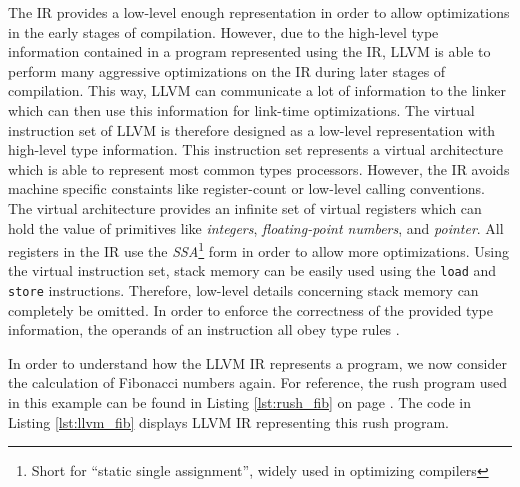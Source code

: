 The IR provides a low-level enough representation in order to allow optimizations in the early stages of compilation.
However, due to the high-level type information contained in a program represented using the IR,
LLVM is able to perform many aggressive optimizations on the IR during later stages of compilation.
This way, LLVM can communicate a lot of information to the linker which can then use this information for link-time optimizations.
The virtual instruction set of LLVM is therefore designed as a low-level representation with high-level type information.
This instruction set represents a virtual architecture which is able to represent most common types processors.
However, the IR avoids machine specific constaints like register-count or low-level calling conventions.
The virtual architecture provides an infinite set of virtual registers which can hold the value of primitives like \emph{integers}, \emph{floating-point numbers}, and \emph{pointer}.
All registers in the IR use the \emph{SSA}\footnote{Short for \enquote{static single assignment}, widely used in optimizing compilers} form in order to allow more optimizations.
Using the virtual instruction set, stack memory can be easily used using the \texttt{load} and \texttt{store} instructions.
Therefore, low-level details concerning stack memory can completely be omitted.
In order to enforce the correctness of the provided type information,
the operands of an instruction all obey type rules \cite[p.~14-17]{Lattner:MSThesis02}. 



In order to understand how the LLVM IR represents a program, we now consider the calculation of Fibonacci numbers again.
For reference, the rush program used in this example can be found in Listing \ref{lst:rush_fib} on page \pageref{lst:rush_fib}.
The code in Listing \ref{lst:llvm_fib} displays LLVM IR representing this rush program.

